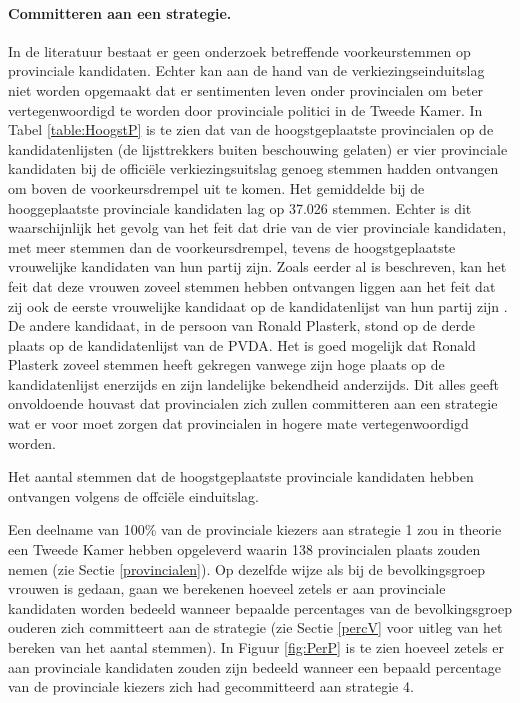 \paragraph{Committeren aan een strategie.}
In de literatuur bestaat er geen onderzoek betreffende voorkeurstemmen op provinciale kandidaten. Echter kan aan de hand van de verkiezingseinduitslag niet worden opgemaakt dat er sentimenten leven onder provincialen om beter vertegenwoordigd te worden door provinciale politici in de Tweede Kamer. In Tabel \ref{table:HoogstP} is te zien dat van de hoogstgeplaatste provincialen op de kandidatenlijsten (de lijsttrekkers buiten beschouwing gelaten) er vier provinciale kandidaten bij de offici\"{e}le verkiezingsuitslag genoeg stemmen hadden ontvangen om boven de voorkeursdrempel uit te komen. Het gemiddelde bij de hooggeplaatste provinciale kandidaten lag op 37.026 stemmen. Echter is dit waarschijnlijk het gevolg van het feit dat drie van de vier provinciale kandidaten, met meer stemmen dan de voorkeursdrempel, tevens de hoogstgeplaatste vrouwelijke kandidaten van hun partij zijn. Zoals eerder al is beschreven, kan het feit dat deze vrouwen zoveel stemmen hebben ontvangen liggen aan het feit dat zij ook de eerste vrouwelijke kandidaat op de kandidatenlijst van hun partij zijn \citep{van2012tweede}. De andere kandidaat, in de persoon van Ronald Plasterk, stond op de derde plaats op de kandidatenlijst van de PVDA. Het is goed mogelijk dat Ronald Plasterk zoveel stemmen heeft gekregen vanwege zijn hoge plaats op de kandidatenlijst enerzijds en zijn landelijke bekendheid anderzijds. Dit alles geeft onvoldoende houvast dat provincialen zich zullen committeren aan een strategie wat er voor moet zorgen dat provincialen in hogere mate vertegenwoordigd worden. \\

\begin{table}[H]
\centering
	\begin{footnotesize}
		
	\end{footnotesize}
			\caption{Het aantal stemmen dat de hoogstgeplaatste provinciale kandidaten hebben ontvangen volgens de offci\"{e}le einduitslag.}
\label{table:HoogstP} 
\end{table}

\indent Een deelname van 100\% van de provinciale kiezers aan strategie 1 zou in theorie een Tweede Kamer hebben opgeleverd waarin 138 provincialen plaats zouden nemen (zie Sectie \ref{provincialen}).  Op dezelfde wijze als bij de bevolkingsgroep vrouwen is gedaan, gaan we berekenen hoeveel zetels er aan provinciale kandidaten worden bedeeld wanneer bepaalde percentages van de bevolkingsgroep ouderen zich committeert aan de strategie (zie Sectie \ref{percV} voor uitleg van het bereken van het aantal stemmen). In Figuur \ref{fig:PerP} is te zien hoeveel zetels er aan provinciale kandidaten zouden zijn bedeeld wanneer een bepaald percentage van de provinciale kiezers zich had gecommitteerd aan strategie 4.


